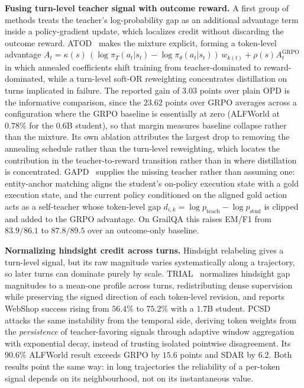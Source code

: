 \documentclass{article} %
\begin{document}
\textbf{Fusing turn-level teacher signal with outcome reward.} A first group of methods treats the teacher's log-probability gap as an additional advantage term inside a policy-gradient update, which localizes credit without discarding the outcome reward. ATOD~\citep{2606.27814} makes the mixture explicit, forming a token-level advantage $A_t = \kappa(s)\,(\log \pi_T(a_t|s_t) - \log \pi_\theta(a_t|s_t))\,w_{k(t)} + \rho(s) A^{\mathrm{GRPO}}_t$ in which annealed coefficients shift training from teacher-dominated to reward-dominated, while a turn-level soft-OR reweighting concentrates distillation on turns implicated in failure. The reported gain of $3.03$ points over plain OPD is the informative comparison, since the $23.62$ points over GRPO averages across a configuration where the GRPO baseline is essentially at zero (ALFWorld at $0.78\%$ for the $0.6$B student), so that margin measures baseline collapse rather than the mixture. Its own ablation attributes the largest drop to removing the annealing schedule rather than the turn-level reweighting, which locates the contribution in the teacher-to-reward transition rather than in where distillation is concentrated. GAPD~\citep{2605.29584} supplies the missing teacher rather than assuming one: entity-anchor matching aligns the student's on-policy execution state with a gold execution state, and the current policy conditioned on the aligned gold action acts as a self-teacher whose token-level gap $d_{i,k} = \log p_{\mathrm{teach}} - \log p_{\mathrm{stud}}$ is clipped and added to the GRPO advantage. On GrailQA this raises EM/F1 from $83.9/86.1$ to $87.8/89.5$ over an outcome-only baseline.

\textbf{Normalizing hindsight credit across turns.} Hindsight relabeling gives a turn-level signal, but its raw magnitude varies systematically along a trajectory, so later turns can dominate purely by scale. TRIAL~\citep{2608.07371} normalizes hindsight gap magnitudes to a mean-one profile across turns, redistributing dense supervision while preserving the signed direction of each token-level revision, and reports WebShop success rising from $56.4\%$ to $75.2\%$ with a $1.7$B student. PCSD~\citep{2608.01837} attacks the same instability from the temporal side, deriving token weights from the \emph{persistence} of teacher-favoring signals through adaptive window aggregation with exponential decay, instead of trusting isolated pointwise disagreement. Its $90.6\%$ ALFWorld result exceeds GRPO by $15.6$ points and SDAR by $6.2$. Both results point the same way: in long trajectories the reliability of a per-token signal depends on its neighbourhood, not on its instantaneous value.
\end{document}
